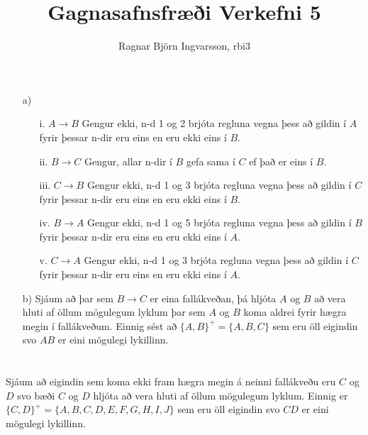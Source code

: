 \documentclass{article}
\title{Gagnasafnsfræði Verkefni 5}
\author{Ragnar Björn Ingvarsson, rbi3}
\begin{document}
\renewcommand\thepage{}
	
	\maketitle

	\newpage
	\setcounter{page}{1}
	\renewcommand\thepage{\arabic{page}}

	\section{}
	\begin{itemize}
		\item[a)]
			\begin{itemize}
				\item[i.] $A \rightarrow B$ Gengur ekki, n-d 1 og 2 brjóta 
					regluna vegna þess að gildin í $A$ fyrir þessar n-dir 
					eru eins en eru ekki eins í $B$.
				\item[ii.] $B \rightarrow C$ Gengur, allar n-dir í $B$ gefa 
					sama í $C$ ef það er eins í $B$.
				\item[iii.] $C \rightarrow B$ Gengur ekki, n-d 1 og 3 brjóta 
					regluna vegna þess að gildin í $C$ fyrir þessar n-dir 
					eru eins en eru ekki eins í $B$.
				\item[iv.] $B \rightarrow A$ Gengur ekki, n-d 1 og 5 brjóta 
					regluna vegna þess að gildin í $B$ fyrir þessar n-dir 
					eru eins en eru ekki eins í $A$.
				\item[v.] $C \rightarrow A$ Gengur ekki, n-d 1 og 3 brjóta 
					regluna vegna þess að gildin í $C$ fyrir þessar n-dir 
					eru eins en eru ekki eins í $A$.
			\end{itemize}
		\item[b)] Sjáum að þar sem $B \rightarrow C$ er eina fallákveðan, 
			þá hljóta $A$ og $B$ að vera hluti af öllum mögulegum lyklum 
			þar sem $A$ og $B$ koma aldrei fyrir hægra megin í fallákveðum. 
			Einnig sést að $\{A,B\}^+ = \{A,B,C\}$ sem eru öll eigindin svo 
			$AB$ er eini mögulegi lykillinn.
	\end{itemize}

	\section{}
	Sjáum að eigindin sem koma ekki fram hægra megin á neinni fallákveðu 
	eru $C$ og $D$ svo bæði $C$ og $D$ hljóta að vera hluti af öllum 
	mögulegum lyklum. Einnig er $\{C,D\}^+ = \{A, B, C, D,E,F,G,H,I,J\}$ 
	sem eru öll eigindin svo $CD$ er eini mögulegi lykillinn.
\end{document}
